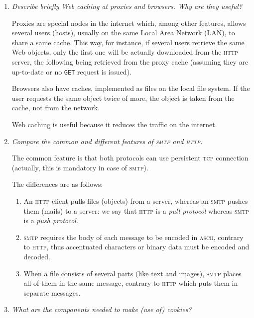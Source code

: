 \documentclass[11pt,a4paper]{article}
\begin{document}
\begin{enumerate}
  \item \emph{Describe briefly Web caching at proxies and
    browsers. Why are they useful?}

  Proxies are special nodes in the internet which, among other
  features, allows several users (hosts), usually on the same Local
  Area Network (LAN), to share a same cache. This way, for instance,
  if several users retrieve the same Web objects, only the first one
  will be actually downloaded from the \textsc{http} server, the
  following being retrieved from the proxy cache (assuming they are
  up-to-date or no \texttt{GET} request is issued). 

  Browsers also have caches, implemented as files on the local file
  system. If the user requests the same object twice of more, the
  object is taken from the cache, not from the network.

  Web caching is useful because it reduces the traffic on the internet.

  \item \emph{Compare the common and different features of
    \textsc{smtp} and \textsc{http}.}

  The common feature is that both protocols can use persistent
  \textsc{tcp} connection (actually, this is mandatory in case of
  \textsc{smtp}).

  The differences are as follows:
  \begin{enumerate}

    \item An \textsc{http} client pulls files (objects) from a server,
    whereas an \textsc{smtp} pushes them (mails) to a server: we say
    that \textsc{http} is a \emph{pull protocol} whereas
    \textsc{smtp} is a \emph{push protocol}.

    \item \textsc{smtp} requires the body of each message to be encoded
    in \textsc{ascii}, contrary to \textsc{http}, thus accentuated
    characters or binary data must be encoded and decoded.

    \item When a file consists of several parts (like text and images),
    \textsc{smtp} places all of them in the same message, contrary to
    \textsc{http} which puts them in separate messages.

  \end{enumerate}

  \item \emph{What are the components needed to make (use of) cookies?}


\end{enumerate}
\end{document}
